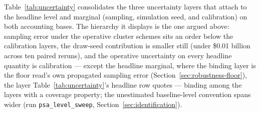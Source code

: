 \documentclass[12pt]{article}
\begin{document}
Table~\ref{tab:uncertainty} consolidates the three uncertainty layers that attach to the headline level and marginal (sampling, simulation seed, and calibration) on both accounting bases. The hierarchy it displays is the one argued above: sampling error under the operative cluster schemes sits an order below the calibration layers, the draw-seed contribution is smaller still (under \$0.01 billion across ten paired reruns), and the operative uncertainty on every headline quantity is calibration --- except the headline marginal, where the binding layer is the floor read's own propagated sampling error (Section~\ref{sec:robustness-floor}), the layer Table~\ref{tab:uncertainty}'s headline row quotes --- binding among the layers with a coverage property; the unestimated baseline-level convention spans wider (run \texttt{psa\_level\_sweep}, Section~\ref{sec:identification}).
\end{document}
